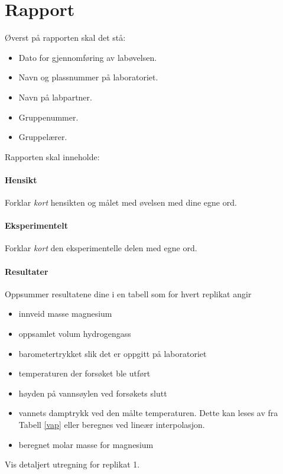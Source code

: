 	\clearpage
	
	\section{Rapport}
	Øverst på rapporten skal det stå:
	\begin{itemize}
		\item Dato for gjennomføring av labøvelsen.
		\item Navn og plassnummer på laboratoriet.
		\item Navn på labpartner.
		\item Gruppenummer.
		\item Gruppelærer.
	\end{itemize}
	
	Rapporten skal inneholde:
	
	\paragraph{Hensikt}
	Forklar \emph{kort} hensikten og målet med øvelsen med dine egne ord.
	
	\paragraph{Eksperimentelt}
	Forklar \emph{kort} den eksperimentelle delen med egne ord.
	
	\paragraph{Resultater}
	Oppsummer resultatene dine i en tabell som for hvert replikat angir
	\begin{itemize}
		\item innveid masse magnesium
		\item oppsamlet volum hydrogengass
		\item barometertrykket slik det er oppgitt på laboratoriet
		\item temperaturen der forsøket ble utført
		\item høyden på vannsøylen ved forsøkets slutt
		\item vannets damptrykk ved den målte temperaturen. Dette kan leses av fra Tabell \ref{vap} eller beregnes ved lineær interpolasjon.
		\item beregnet molar masse for magnesium
	\end{itemize}
	
	Vis detaljert utregning for replikat 1.
	
